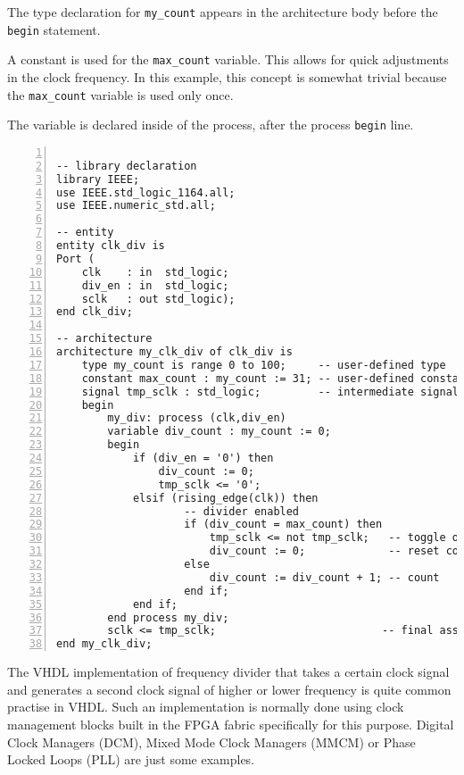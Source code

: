 \begin{my_list}
\item The type declaration for  \texttt{my\_count} appears in the architecture body before the \texttt{begin} statement. 

\item A constant is used for the  \texttt{max\_count} variable. This allows for quick adjustments in the clock frequency. In this example, this concept is somewhat trivial because the  \texttt{max\_count} variable is used only once.  

\item The variable is declared inside of the process, after the process \texttt{begin} line.
\end{my_list}

\noindent
\begin{minipage}{0.99\linewidth}
\begin{lstlisting}[numbers=left,label=ex26_code, caption=Solution to Example 26.]

-- library declaration
library IEEE;
use IEEE.std_logic_1164.all;
use IEEE.numeric_std.all;

-- entity
entity clk_div is
Port (
    clk    : in  std_logic;
    div_en : in  std_logic;
    sclk   : out std_logic);
end clk_div;

-- architecture
architecture my_clk_div of clk_div is
    type my_count is range 0 to 100;     -- user-defined type
    constant max_count : my_count := 31; -- user-defined constant
    signal tmp_sclk : std_logic;         -- intermediate signal
    begin
        my_div: process (clk,div_en)
        variable div_count : my_count := 0;
        begin
            if (div_en = '0') then
                div_count := 0;
                tmp_sclk <= '0';             
            elsif (rising_edge(clk)) then
                    -- divider enabled
                    if (div_count = max_count) then
                        tmp_sclk <= not tmp_sclk;   -- toggle output
                        div_count := 0;             -- reset count
                    else
                        div_count := div_count + 1; -- count
                    end if;
            end if;
        end process my_div;
        sclk <= tmp_sclk;                          -- final assignment
end my_clk_div;
\end{lstlisting}
\end{minipage}

The VHDL implementation of frequency divider that takes a certain clock signal and generates a second clock signal of higher or lower frequency is quite common practise in VHDL. Such an implementation is normally done using clock management blocks built in the FPGA fabric specifically for this purpose. Digital Clock Managers (DCM), Mixed Mode Clock Managers (MMCM) or Phase Locked Loops (PLL) are just some examples.

